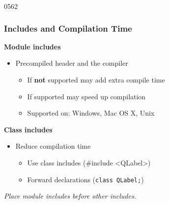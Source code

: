 \begin{slide}[fragile]{0562}\frametitle{Includes and Compilation Time} 
  \textbf{Module includes}
  \begin{itemize}
  \begin{cpp}
#include <QtGui>
  \end{cpp}
\item Precompiled header and the compiler
  \begin{itemize}
  \item If \textbf{not} supported may add extra compile time
  \item If supported may speed up compilation
  \item Supported on: Windows, Mac OS X, Unix \\
  \end{itemize}
 \end{itemize}
\textbf{Class includes}
\begin{itemize}
 \begin{cpp}
#include <QLabel>
  \end{cpp}
   \item Reduce compilation time
     \begin{itemize}
     \item Use class includes (\#include <QLabel>)
     \item Forward declarations (\texttt{class QLabel;})
     \end{itemize}
   \end{itemize}
   \vspace{3mm}
   \textit{Place module includes before other includes.}
\end{slide}
